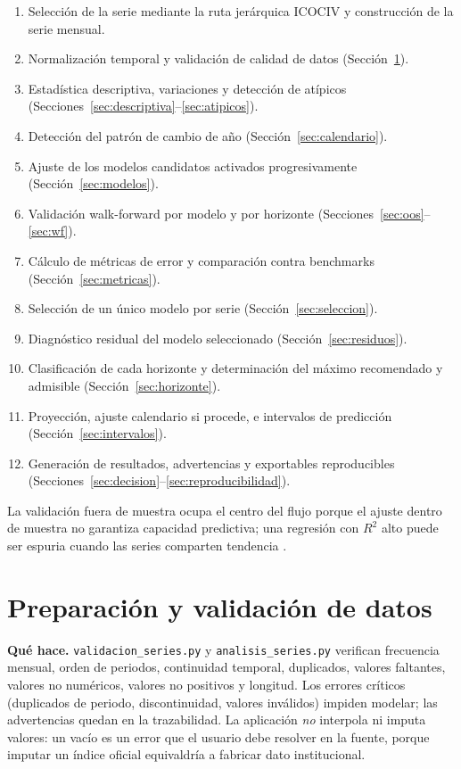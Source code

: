 \documentclass[12pt]{article}
\begin{document}
\begin{enumerate}
  \item Selecci\'on de la serie mediante la ruta jer\'arquica ICOCIV y construcci\'on de la serie mensual.
  \item Normalizaci\'on temporal y validaci\'on de calidad de datos (Secci\'on~\ref{sec:preparacion}).
  \item Estad\'istica descriptiva, variaciones y detecci\'on de at\'ipicos (Secciones~\ref{sec:descriptiva}--\ref{sec:atipicos}).
  \item Detecci\'on del patr\'on de cambio de a\~no (Secci\'on~\ref{sec:calendario}).
  \item Ajuste de los modelos candidatos activados progresivamente (Secci\'on~\ref{sec:modelos}).
  \item Validaci\'on walk-forward por modelo y por horizonte (Secciones~\ref{sec:oos}--\ref{sec:wf}).
  \item C\'alculo de m\'etricas de error y comparaci\'on contra benchmarks (Secci\'on~\ref{sec:metricas}).
  \item Selecci\'on de un \'unico modelo por serie (Secci\'on~\ref{sec:seleccion}).
  \item Diagn\'ostico residual del modelo seleccionado (Secci\'on~\ref{sec:residuos}).
  \item Clasificaci\'on de cada horizonte y determinaci\'on del m\'aximo recomendado y admisible (Secci\'on~\ref{sec:horizonte}).
  \item Proyecci\'on, ajuste calendario si procede, e intervalos de predicci\'on (Secci\'on~\ref{sec:intervalos}).
  \item Generaci\'on de resultados, advertencias y exportables reproducibles (Secciones~\ref{sec:decision}--\ref{sec:reproducibilidad}).
\end{enumerate}

La validaci\'on fuera de muestra ocupa el centro del flujo porque el ajuste dentro de muestra no garantiza capacidad predictiva; una regresi\'on con $R^2$ alto puede ser espuria cuando las series comparten tendencia \citep{granger_newbold1974,springer_spurious_regressions}.

\section{Preparaci\'on y validaci\'on de datos}
\label{sec:preparacion}

\textbf{Qu\'e hace.} \texttt{validacion\_series.py} y \texttt{analisis\_series.py} verifican frecuencia mensual, orden de periodos, continuidad temporal, duplicados, valores faltantes, valores no num\'ericos, valores no positivos y longitud. Los errores cr\'iticos (duplicados de periodo, discontinuidad, valores inv\'alidos) impiden modelar; las advertencias quedan en la trazabilidad. La aplicaci\'on \emph{no} interpola ni imputa valores: un vac\'io es un error que el usuario debe resolver en la fuente, porque imputar un \'indice oficial equivaldr\'ia a fabricar dato institucional.
\end{document}
